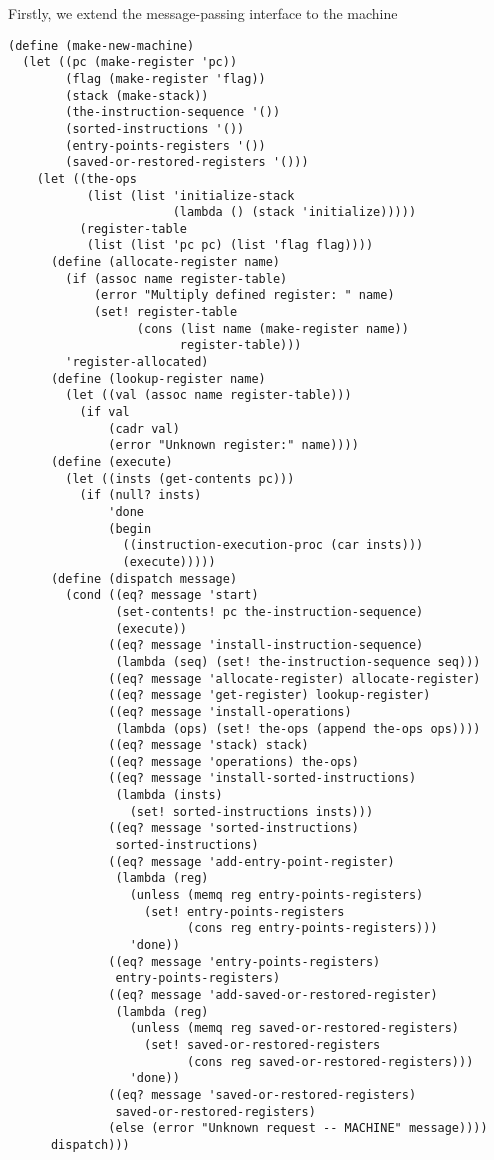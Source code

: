 \documentclass[a4paper,12pt]{article}
\begin{document}
Firstly, we extend the message-passing interface to the machine

\begin{lstlisting}
(define (make-new-machine)
  (let ((pc (make-register 'pc))
        (flag (make-register 'flag))
        (stack (make-stack))
        (the-instruction-sequence '())
        (sorted-instructions '())
        (entry-points-registers '())
        (saved-or-restored-registers '()))
    (let ((the-ops
           (list (list 'initialize-stack
                       (lambda () (stack 'initialize)))))
          (register-table
           (list (list 'pc pc) (list 'flag flag))))
      (define (allocate-register name)
        (if (assoc name register-table)
            (error "Multiply defined register: " name)
            (set! register-table
                  (cons (list name (make-register name))
                        register-table)))
        'register-allocated)
      (define (lookup-register name)
        (let ((val (assoc name register-table)))
          (if val
              (cadr val)
              (error "Unknown register:" name))))
      (define (execute)
        (let ((insts (get-contents pc)))
          (if (null? insts)
              'done
              (begin
                ((instruction-execution-proc (car insts)))
                (execute)))))
      (define (dispatch message)
        (cond ((eq? message 'start)
               (set-contents! pc the-instruction-sequence)
               (execute))
              ((eq? message 'install-instruction-sequence)
               (lambda (seq) (set! the-instruction-sequence seq)))
              ((eq? message 'allocate-register) allocate-register)
              ((eq? message 'get-register) lookup-register)
              ((eq? message 'install-operations)
               (lambda (ops) (set! the-ops (append the-ops ops))))
              ((eq? message 'stack) stack)
              ((eq? message 'operations) the-ops)
              ((eq? message 'install-sorted-instructions)
               (lambda (insts)
                 (set! sorted-instructions insts)))
              ((eq? message 'sorted-instructions)
               sorted-instructions)
              ((eq? message 'add-entry-point-register)
               (lambda (reg)
                 (unless (memq reg entry-points-registers)
                   (set! entry-points-registers
                         (cons reg entry-points-registers)))
                 'done))
              ((eq? message 'entry-points-registers)
               entry-points-registers)
              ((eq? message 'add-saved-or-restored-register)
               (lambda (reg)
                 (unless (memq reg saved-or-restored-registers)
                   (set! saved-or-restored-registers
                         (cons reg saved-or-restored-registers)))
                 'done))
              ((eq? message 'saved-or-restored-registers)
               saved-or-restored-registers)
              (else (error "Unknown request -- MACHINE" message))))
      dispatch)))
\end{lstlisting}
\end{document}
